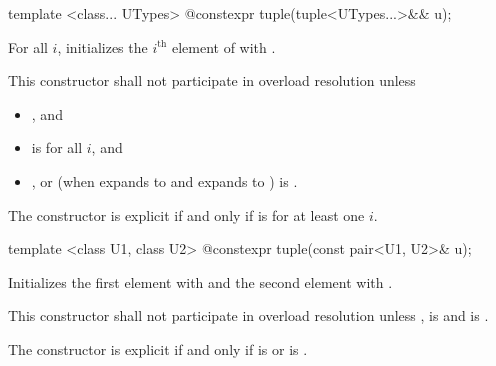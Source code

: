 %
\begin{itemdecl}
template <class... UTypes> @\EXPLICIT@ constexpr tuple(tuple<UTypes...>&& u);
\end{itemdecl}

\begin{itemdescr}
\pnum
\effects For all $i$,
initializes the $i^\text{th}$ element of  with
.

\pnum
\remarks This constructor shall not participate in overload resolution unless

\begin{itemize}
\item
{} \tcode{==} , and
\item
{} is  for all $i$, and
\item
{}, or
(when  expands to  and  expands to )\linebreak
{}
is .
\end{itemize}
The constructor is explicit if and only if
 is 
for at least one $i$.
\end{itemdescr}

%
%
\begin{itemdecl}
template <class U1, class U2> @\EXPLICIT@ constexpr tuple(const pair<U1, U2>& u);
\end{itemdecl}

\begin{itemdescr}
\pnum
\effects Initializes the first element with  and the
second element with .

\pnum
\remarks This constructor shall not participate in overload resolution unless
,
 is  and
 is .

\pnum
The constructor is explicit if and only if
 is  or
 is .
\end{itemdescr}

